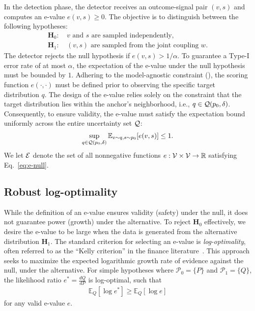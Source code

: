 In the detection phase, the detector receives an outcome-signal pair $(v,s)$ and computes an e-value $e(v,s) \geq 0$. The objective is to distinguish between the following hypotheses:
\begin{align*}
    \textbf{H}_0: &~ v \text{ and } s \text{ are sampled independently},\\
    \textbf{H}_1: &~ (v,s) \text{ are sampled from the joint coupling } w.
\end{align*}
The detector rejects the null hypothesis if $e(v,s) > 1/\alpha$. To guarantee a Type-I error rate of at most $\alpha$, the expectation of the e-value under the null hypothesis must be bounded by $1$. Adhering to the model-agnostic constraint (), the scoring function $e(\cdot, \cdot)$ must be defined prior to observing the specific target distribution $q$. The design of the e-value relies solely on the constraint that the target distribution lies within the anchor's neighborhood, i.e., $q \in \mathcal{Q}(p_0,\delta)$. Consequently, to ensure validity, the e-value must satisfy the expectation bound uniformly across the entire uncertainty set $\mathcal{Q}$:
\begin{align}\label{eq:e-null}
    \sup_{q \in \mathcal{Q}(p_0,\delta)} \mathbb{E}_{v \sim q, s \sim p_0} [e(v,s)] \leq 1.
\end{align}
We let $\mathcal{E}$ denote the set of all nonnegative functions $e: \mathcal{V} \times \mathcal{V} \to \mathbb{R}$ satisfying Eq.~\eqref{eq:e-null}.

\subsection{Robust log-optimality}

While the definition of an e-value ensures validity (safety) under the null, it does not guarantee power (growth) under the alternative. To reject $\textbf{H}_0$ effectively, we desire the e-value to be large when the data is generated from the alternative distribution $\textbf{H}_1$. The standard criterion for selecting an e-value is \textit{log-optimality}, often referred to as the ``Kelly criterion'' in the finance literature~\citep{kelly1956new}. This approach seeks to maximize the expected logarithmic growth rate of evidence against the null, under the alternative. For simple hypotheses where $\mathcal{P}_0 = \{P\}$ and $\mathcal{P}_1 = \{Q\}$, the likelihood ratio $e^* = \frac{dQ}{dP}$ is log-optimal, such that
\begin{align*}
    \mathbb{E}_Q[\log e^*] \ge \mathbb{E}_Q[\log e]
\end{align*}
for any valid e-value $e$.

